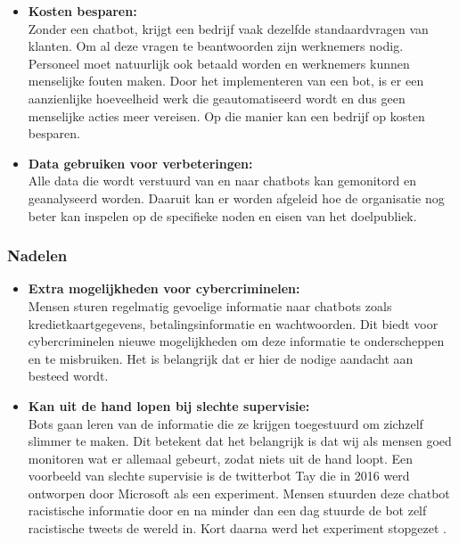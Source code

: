 \begin{itemize}
    \item \textbf{Kosten besparen:} \\
    
    Zonder een chatbot, krijgt een bedrijf vaak dezelfde standaardvragen van klanten. Om al deze vragen te beantwoorden zijn werknemers nodig. Personeel moet natuurlijk ook betaald worden en werknemers kunnen menselijke fouten maken. Door het implementeren van een bot, is er een aanzienlijke hoeveelheid werk die geautomatiseerd wordt en dus geen menselijke acties meer vereisen. Op die manier kan een bedrijf op kosten besparen. \\
    
    \item \textbf{Data gebruiken voor verbeteringen:} \\
    
    Alle data die wordt verstuurd van en naar chatbots kan gemonitord en geanalyseerd worden. Daaruit kan er worden afgeleid hoe de organisatie nog beter kan inspelen op de specifieke noden en eisen van het doelpubliek. \\ 
    
\end{itemize}

\subsubsection{Nadelen}
\label{subsubsec:chatbots-voor-en-nadelen-nadelen}

\begin{itemize}
    \item \textbf{Extra mogelijkheden voor cybercriminelen:} \\
    
    Mensen sturen regelmatig gevoelige informatie naar chatbots zoals kredietkaartgegevens, betalingsinformatie en wachtwoorden. Dit biedt voor cybercriminelen nieuwe mogelijkheden om deze informatie te onderscheppen en te misbruiken. Het is belangrijk dat er hier de nodige aandacht aan besteed wordt. \\
    
    \item \textbf{Kan uit de hand lopen bij slechte supervisie:} \\
    
    Bots gaan leren van de informatie die ze krijgen toegestuurd om zichzelf slimmer te maken. Dit betekent dat het belangrijk is dat wij als mensen goed monitoren wat er allemaal gebeurt, zodat niets uit de hand loopt. Een voorbeeld van slechte supervisie is de twitterbot Tay die in 2016 werd ontworpen door Microsoft als een experiment. Mensen stuurden deze chatbot racistische informatie door en na minder dan een dag stuurde de bot zelf racistische tweets de wereld in. Kort daarna werd het experiment stopgezet \autocite{Vincent2016}. \\
    
\end{itemize}

